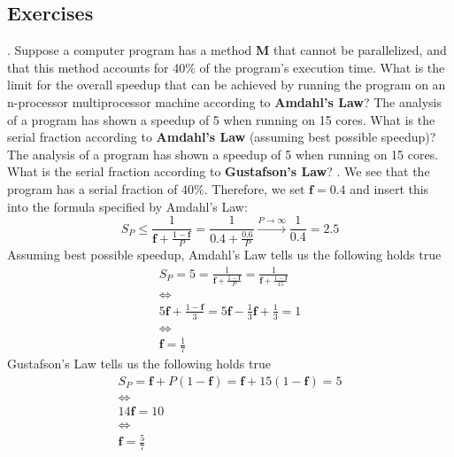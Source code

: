 \documentclass[main.tex]{subfiles}
\begin{document}
\pagebreak

\subsection{Exercises}

\begin{ExerciseList}
    \Exercise[title={Amdahl's Law, Gustafson's Law, Performance},label=AGL].
        \Question Suppose a computer program has a method \textbf{M} that cannot be parallelized, and that this method accounts for 40\% of the program’s execution time. What is the limit for the overall speedup that can be achieved by running the program on an n-processor multiprocessor machine according to \textbf{Amdahl's Law}?
        \Question The analysis of a program has shown a speedup of 5 when running on 15 cores. What is the serial fraction according to \textbf{Amdahl's Law} (assuming best possible speedup)?
        \Question The analysis of a program has shown a speedup of 5 when running on 15 cores. What is the serial fraction according to \textbf{Gustafson's Law}?
    \Answer[ref={AGL}].
        \Question We see that the program has a serial fraction of 40\%. Therefore, we set $\mathbf{f} = 0.4$ and insert this into the formula specified by Amdahl's Law:
            \begin{equation*}
                S_P \leq \frac{1}{\mathbf{f} + \frac{1-\mathbf{f}}{P}} = \frac{1}{0.4 + \frac{0.6}{P}} \xrightarrow{P \rightarrow \infty} \frac{1}{0.4} = 2.5
            \end{equation*}
        \Question Assuming best possible speedup, Amdahl's Law tells us the following holds true
            \begin{gather*}
                S_P = 5 = \frac{1}{\mathbf{f}+\frac{1-\mathbf{f}}{P}} = \frac{1}{\mathbf{f}+\frac{1-\mathbf{f}}{15}} \\
                \Longleftrightarrow\\
                5 \mathbf{f} + \frac{1-\mathbf{f}}{3} = 5 \mathbf{f} - \frac{1}{3} \mathbf{f} + \frac{1}{3} = 1\\
                \Longleftrightarrow\\
                \mathbf{f} = \frac{1}{7}
            \end{gather*}
        \Question Gustafson's Law tells us the following holds true
            \begin{gather*}
                S_P = \mathbf{f} + P (1 - \mathbf{f})
                    = \mathbf{f} + 15 (1 - \mathbf{f})
                    = 5 \\
                \Longleftrightarrow\\
                14 \mathbf{f} = 10\\
                \Longleftrightarrow\\
                \mathbf{f} = \frac{5}{7}
            \end{gather*}
        

\end{ExerciseList}
\end{document}
